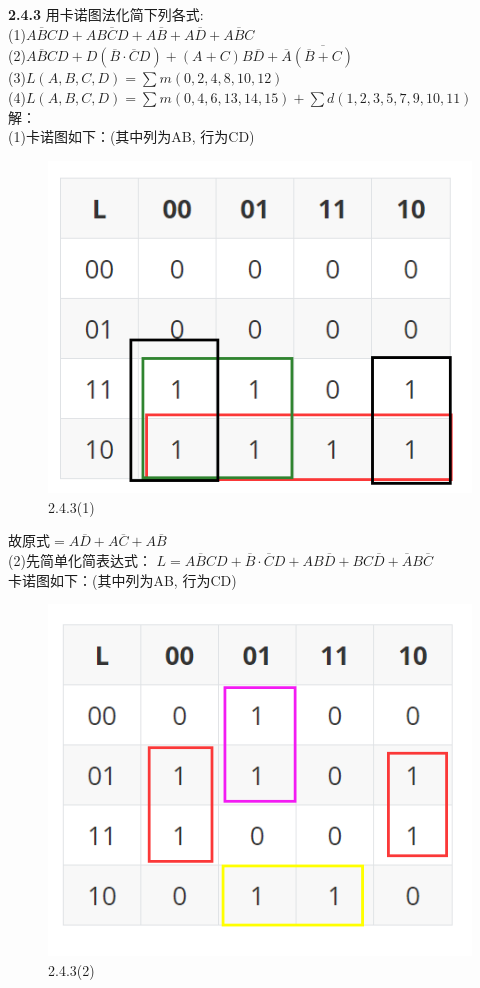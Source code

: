 \documentclass[a4paper,11pt,UTF8]{article}
\begin{document}
\textbf{2.4.3} 用卡诺图法化简下列各式:\\
(1)$A\overline{B}CD+AB\overline{C}D+A\overline{B}+A\overline{D}+A\overline{B}C$\\
(2)$A\overline{B}CD+D(\overline{B}\cdot\overline{C}D)+(A+C)B\overline{D}+\overline{A}\overline{(\overline{B}+C)}
$\\
(3)$
L(A,B,C,D)=\sum m(0,2,4,8,10,12)
$\\
(4)$
L(A,B,C,D)=\sum m(0,4,6,13,14,15)+\sum d(1,2,3,5,7,9,10,11)
$\\ 
解：\\
(1)卡诺图如下：(其中列为AB, 行为CD)
\begin{figure}[H] 
	\centering 
	\includegraphics[scale=0.30]{SD2.4.3_1.png}
	\caption{2.4.3(1)}
\end{figure}
故原式$=A\overline{D}+A\overline{C}+A\overline{B}$\\
(2)先简单化简表达式：
$L=A\overline{B}CD+\overline{B}\cdot\overline{C}D+AB\overline{D}+BC\overline{D}+\overline{A}B\overline{C}$\\
卡诺图如下：(其中列为AB, 行为CD)
\begin{figure}[H] 
	\centering 
	\includegraphics[scale=0.30]{SD2.4.3_2.png}
	\caption{2.4.3(2)}
\end{figure}
\end{document}
